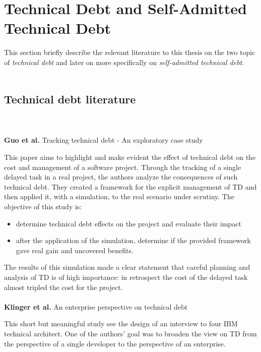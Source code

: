 \section{Technical Debt and Self-Admitted Technical Debt} %

This section briefly describe the relevant literature to this thesis on the two topic of \emph{technical debt} and later on more specifically on \emph{self-admitted technical debt}.
\\
\\
\subsection{Technical debt literature}
\\
\\
\textbf{Guo et al.} \cite{guo2011tracking} Tracking technical debt - An exploratory case study

This paper aims to highlight and make evident the effect of technical debt on the cost and management of a software project. Through the tracking of a single delayed task in a real project, the authors analyze the consequences of such technical debt. They created a framework for the explicit management of TD and then applied it, with a simulation, to the real scenario under scrutiny.
The objective of this study is:
\begin{itemize}
    \item determine technical debt effects on the project and evaluate their impact
    \item after the application of the simulation, determine if the provided framework gave real gain and uncovered benefits.
\end{itemize}
The results of this simulation made a clear statement that careful planning and analysis of TD is of high importance: in retrospect the cost of the delayed task almost tripled the cost for the project.
\\
\\
\textbf{Klinger et al.} \cite{klinger2011enterprise} An enterprise perspective on technical debt

This short but meaningful study see the design of an interview to four IBM technical architect. One of the authors' goal was to broaden the view on TD from the perspective of a single developer to the perspective of an enterprise.

